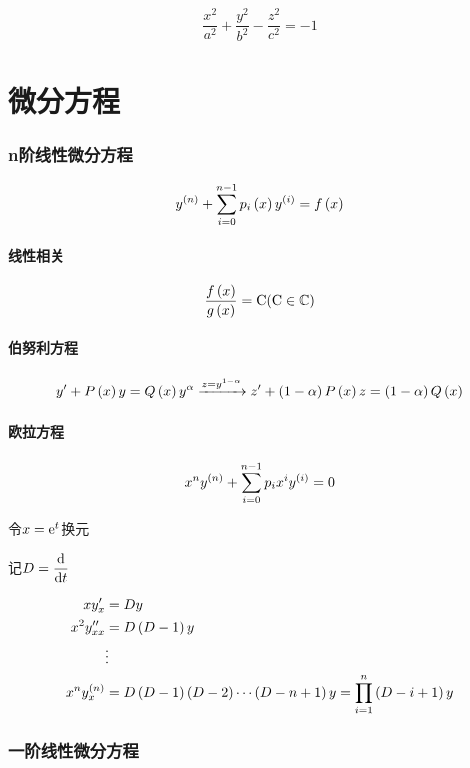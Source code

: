 \documentclass{article}
\begin{document}
\[\frac{x^2}{a^2}+\frac{y^2}{b^2}-\frac{z^2}{c^2}=-1\]

\part{微分方程}

\section{n阶线性微分方程}

\begin{definition}[]
    \[y^{\left(n\right)}+\sum_{i=0}^{n-1}p_i\left(x\right)y^{\left(i\right)}=f\left(x\right)\label{LinearDifferentialEquationsOfOrderN}\]
\end{definition}

\subsection{线性相关}

\[\frac{f\left(x\right)}{g\left(x\right)}=\mathrm C(\mathrm C\in\mathbb C)\]

\subsection{伯努利方程}

\[y^\prime+P\left(x\right)y=Q\left(x\right)y^\alpha\xrightarrow{z=y^{1-\alpha}} z^\prime+\left(1-\alpha\right)P\left(x\right)z=\left(1-\alpha\right)Q\left(x\right)\]

\subsection{欧拉方程}

\[x^ny^{\left(n\right)}+\sum_{i=0}^{n-1}p_ix^iy^{\left(i\right)}=0\]

令$x=\mathrm e^t$换元

记$D=\dfrac{\mathrm d}{\mathrm d t}$

\[\begin{aligned}
        xy_x^\prime              & =Dy                                                      \\
        x^2y_{xx}^{\prime\prime} & =D\left(D-1\right)y                                               \\
                                 & \vdots                                                   \\
        x^ny_x^{\left(n\right)}           & =D\left(D-1\right)\left(D-2\right)\cdots\left(D-n+1\right)y=\prod_{i=1}^n\left(D-i+1\right)y
    \end{aligned}\]

\section{一阶线性微分方程}
\end{document}
